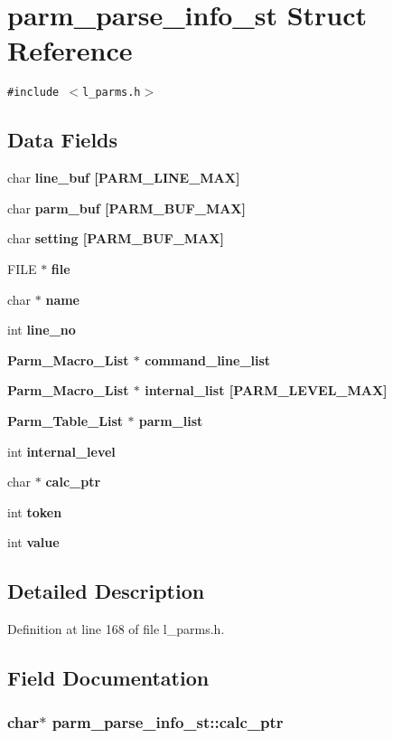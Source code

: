\section{parm\_\-parse\_\-info\_\-st Struct Reference}
\label{structparm__parse__info__st}
{\tt \#include $<$l\_\-parms.h$>$}

\subsection*{Data Fields}
\begin{CompactItemize}
\item 
char \bf{line\_\-buf} [PARM\_\-LINE\_\-MAX]
\item 
char \bf{parm\_\-buf} [PARM\_\-BUF\_\-MAX]
\item 
char \bf{setting} [PARM\_\-BUF\_\-MAX]
\item 
FILE $\ast$ \bf{file}
\item 
char $\ast$ \bf{name}
\item 
int \bf{line\_\-no}
\item 
\bf{Parm\_\-Macro\_\-List} $\ast$ \bf{command\_\-line\_\-list}
\item 
\bf{Parm\_\-Macro\_\-List} $\ast$ \bf{internal\_\-list} [PARM\_\-LEVEL\_\-MAX]
\item 
\bf{Parm\_\-Table\_\-List} $\ast$ \bf{parm\_\-list}
\item 
int \bf{internal\_\-level}
\item 
char $\ast$ \bf{calc\_\-ptr}
\item 
int \bf{token}
\item 
int \bf{value}
\end{CompactItemize}


\subsection{Detailed Description}




Definition at line 168 of file l\_\-parms.h.

\subsection{Field Documentation}
\subsubsection{\setlength{\rightskip}{0pt plus 5cm}char$\ast$ \bf{parm\_\-parse\_\-info\_\-st::calc\_\-ptr}}\label{structparm__parse__info__st_2473bd5d235abc51e152ae76cfb8d116}




